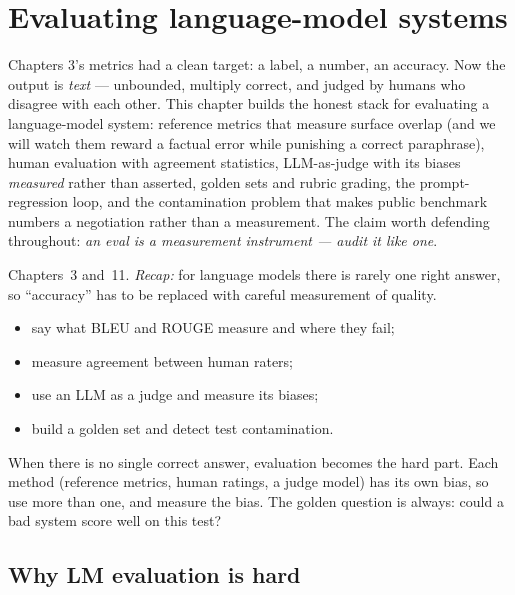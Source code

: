\chapter{Evaluating language-model systems}
\label{ch:lmeval}

Chapters 3's metrics had a clean target: a label, a number, an
accuracy. Now the output is \emph{text} --- unbounded, multiply
correct, and judged by humans who disagree with each other. This
chapter builds the honest stack for evaluating a language-model
system: reference metrics that measure surface overlap (and we will
watch them reward a factual error while punishing a correct
paraphrase), human evaluation with agreement statistics, LLM-as-judge
with its biases \emph{measured} rather than asserted, golden sets and
rubric grading, the prompt-regression loop, and the contamination
problem that makes public benchmark numbers a negotiation rather than
a measurement. The claim worth defending throughout: \emph{an eval is
a measurement instrument --- audit it like one}.

\begin{rulebox}
Chapters~3 and~11. \emph{Recap:} for language models there is rarely one right answer, so ``accuracy'' has to be replaced with careful measurement of quality.
\end{rulebox}
\begin{wins}
\begin{itemize}
\item say what BLEU and ROUGE measure and where they fail;
\item measure agreement between human raters;
\item use an LLM as a judge and measure its biases;
\item build a golden set and detect test contamination.
\end{itemize}
\end{wins}
\begin{principle}
When there is no single correct answer, evaluation becomes the hard part. Each method (reference metrics, human ratings, a judge model) has its own bias, so use more than one, and measure the bias. The golden question is always: could a bad system score well on this test?
\end{principle}

\section{Why LM evaluation is hard}
\label{sec:whyhard}

